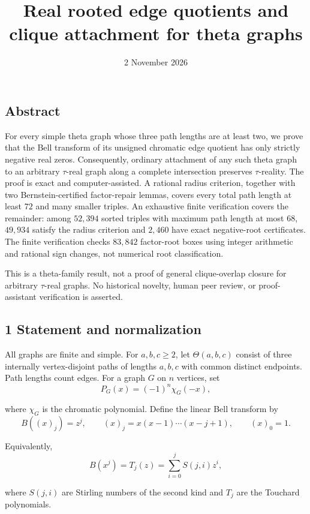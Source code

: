 \documentclass[
  11pt,
  a4paper,
]{article}
\title{Real rooted edge quotients and clique attachment for theta
graphs}
\author{}
\date{2 November 2026}
\makeatletter
\renewcommand{\maketitle}{%
  \begin{center}
    {\LARGE\@title\par}
    \vspace{0.8em}
    {\normalsize\@date\par}
  \end{center}
  \vspace{0.8em}
}
\makeatother
\begin{document}
\maketitle

\subsection{Abstract}\label{abstract}

For every simple theta graph whose three path lengths are at least two,
we prove that the Bell transform of its unsigned chromatic edge quotient
has only strictly negative real zeros. Consequently, ordinary attachment
of any such theta graph to an arbitrary \(\tau\)-real graph along a
complete intersection preserves \(\tau\)-reality. The proof is exact and
computer-assisted. A rational radius criterion, together with two
Bernstein-certified factor-repair lemmas, covers every total path length
at least \(72\) and many smaller triples. An exhaustive finite
verification covers the remainder: among \(52,394\) sorted triples with
maximum path length at most \(68\), \(49,934\) satisfy the radius
criterion and \(2,460\) have exact negative-root certificates. The
finite verification checks \(83,842\) factor-root boxes using integer
arithmetic and rational sign changes, not numerical root classification.

This is a theta-family result, not a proof of general clique-overlap
closure for arbitrary \(\tau\)-real graphs. No historical novelty, human
peer review, or proof-assistant verification is asserted.

\subsection{1 Statement and
normalization}\label{statement-and-normalization}

All graphs are finite and simple. For \(a,b,c\geq2\), let
\(\Theta(a,b,c)\) consist of three internally vertex-disjoint paths of
lengths \(a,b,c\) with common distinct endpoints. Path lengths count
edges. For a graph \(G\) on \(n\) vertices, set
\nopagebreak
\[
P_G(x)=(-1)^n\chi_G(-x),
\]

where \(\chi_G\) is the chromatic polynomial. Define the linear Bell
transform by
\nopagebreak
\[
B((x)_j)=z^j,\qquad
(x)_j=x(x-1)\cdots(x-j+1),\qquad (x)_0=1.
\]

Equivalently,
\nopagebreak
\[
B(x^j)=T_j(z)=\sum_{i=0}^j S(j,i)z^i,
\]

where \(S(j,i)\) are Stirling numbers of the second kind and \(T_j\) are
the Touchard polynomials.
\end{document}
